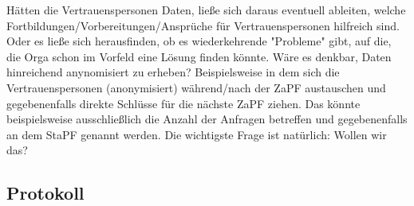     Hätten die Vertrauenspersonen Daten, ließe sich daraus eventuell ableiten, welche Fortbildungen/Vorbereitungen/Ansprüche für Vertrauenspersonen hilfreich sind. Oder es ließe sich herausfinden, ob es wiederkehrende "Probleme" gibt, auf die, die Orga schon im Vorfeld eine Lösung finden könnte.
    Wäre es denkbar, Daten hinreichend anynomisiert zu erheben? Beispielsweise in dem sich die Vertrauenspersonen (anonymisiert) während/nach der ZaPF austauschen und gegebenenfalls direkte Schlüsse für die nächste ZaPF ziehen. Das könnte beispielsweise ausschließlich die Anzahl der Anfragen betreffen und gegebenenfalls an dem StaPF genannt werden.
    Die wichtigste Frage ist natürlich: Wollen wir das?

  \subsection*{Protokoll}
